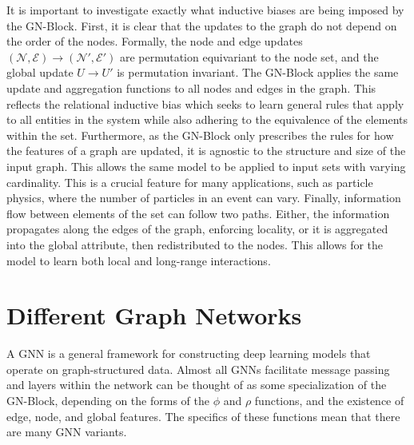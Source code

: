 It is important to investigate exactly what inductive biases are being imposed by the GN-Block.
First, it is clear that the updates to the graph do not depend on the order of the nodes.
Formally, the node and edge updates $(\mathcal{N}, \mathcal{E}) \rightarrow (\mathcal{N}', \mathcal{E}')$ are permutation equivariant to the node set, and the global update $U \rightarrow U'$ is permutation invariant.
The GN-Block applies the same update and aggregation functions to all nodes and edges in the graph.
This reflects the relational inductive bias which seeks to learn general rules that apply to all entities in the system while also adhering to the equivalence of the elements within the set.
Furthermore, as the GN-Block only prescribes the rules for how the features of a graph are updated, it is agnostic to the structure and size of the input graph.
This allows the same model to be applied to input sets with varying cardinality.
This is a crucial feature for many applications, such as particle physics, where the number of particles in an event can vary.
Finally, information flow between elements of the set can follow two paths.
Either, the information propagates along the edges of the graph, enforcing locality, or it is aggregated into the global attribute, then redistributed to the nodes.
This allows for the model to learn both local and long-range interactions.

\section{Different Graph Networks}

A GNN is a general framework for constructing deep learning models that operate on graph-structured data.
Almost all GNNs facilitate message passing and layers within the network can be thought of as some specialization of the GN-Block, depending on the forms of the $\phi$ and $\rho$ functions, and the existence of edge, node, and global features.
The specifics of these functions mean that there are many GNN variants.

